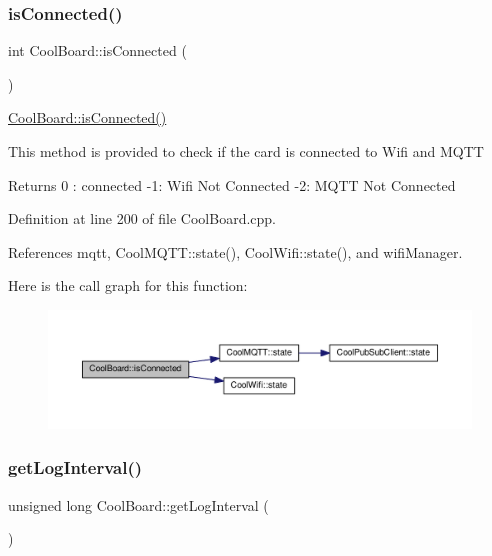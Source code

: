 \subsubsection{\texorpdfstring{is\+Connected()}{isConnected()}}
{\footnotesize\ttfamily int Cool\+Board\+::is\+Connected (\begin{DoxyParamCaption}{ }\end{DoxyParamCaption})}

\hyperlink{class_cool_board_ad7442cf4b62c7b0d5bd62a0f75ffc065}{Cool\+Board\+::is\+Connected()}

This method is provided to check if the card is connected to Wifi and M\+Q\+TT

\begin{DoxyReturn}{Returns}
0 \+: connected -\/1\+: Wifi Not Connected -\/2\+: M\+Q\+TT Not Connected 
\end{DoxyReturn}


Definition at line 200 of file Cool\+Board.\+cpp.



References mqtt, Cool\+M\+Q\+T\+T\+::state(), Cool\+Wifi\+::state(), and wifi\+Manager.

Here is the call graph for this function\+:\nopagebreak
\begin{figure}[H]
\begin{center}
\leavevmode
\includegraphics[width=350pt]{d7/df9/class_cool_board_ad7442cf4b62c7b0d5bd62a0f75ffc065_cgraph}
\end{center}
\end{figure}
\mbox{\label{class_cool_board_a7508e029f2ee17bb747ffab599285e0d}} 
\subsubsection{\texorpdfstring{get\+Log\+Interval()}{getLogInterval()}}
{\footnotesize\ttfamily unsigned long Cool\+Board\+::get\+Log\+Interval (\begin{DoxyParamCaption}{ }\end{DoxyParamCaption})}

